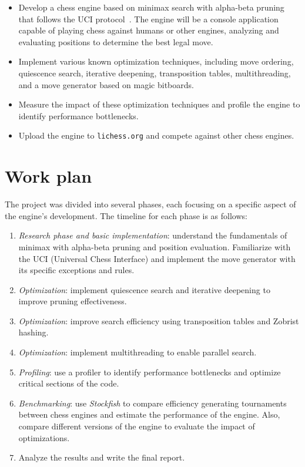 \begin{itemize}[itemsep=1pt]
    \item Develop a chess engine based on minimax search with alpha-beta pruning that follows the UCI protocol~\cite{UciProtocol}. The engine will be a console application capable of playing chess against humans or other engines, analyzing and evaluating positions to determine the best legal move.
    \item Implement various known optimization techniques, including move ordering, quiescence search, iterative deepening, transposition tables, multithreading, and a move generator based on magic bitboards.
    \item Measure the impact of these optimization techniques and profile the engine to identify performance bottlenecks.
    \item Upload the engine to \texttt{lichess.org} and compete against other chess engines.
\end{itemize}

\section{Work plan}

The project was divided into several phases, each focusing on a specific aspect of the engine's development. The timeline for each phase is as follows:

\begin{enumerate}
    \item \textit{Research phase and basic implementation}: understand the fundamentals of minimax with alpha-beta pruning and position evaluation. Familiarize with the UCI (Universal Chess Interface) and implement the move generator with its specific exceptions and rules.
    \item \textit{Optimization}: implement quiescence search and iterative deepening to improve pruning effectiveness.
    \item \textit{Optimization}: improve search efficiency using transposition tables and Zobrist hashing.
    \item \textit{Optimization}: implement multithreading to enable parallel search.
    \item \textit{Profiling}: use a profiler to identify performance bottlenecks and optimize critical sections of the code.
    \item \textit{Benchmarking}: use \textit{Stockfish} to compare efficiency generating tournaments between chess engines and estimate the performance of the engine. Also, compare different versions of the engine to evaluate the impact of optimizations.
    \item Analyze the results and write the final report.
\end{enumerate}

